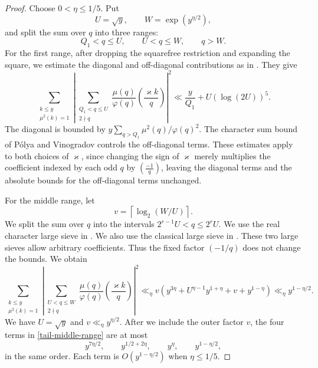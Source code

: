 \documentclass[12pt,reqno]{amsart}
\numberwithin{equation}{section}
\theoremstyle{plain}
\theoremstyle{remark}
\begin{document}
\begin{proof}
Choose $0<\eta\leq1/5$.  Put
\[
 U=\sqrt y,\qquad W=\exp(y^{\eta/2}),
\]
and split the sum over $q$ into three ranges:
\[
 Q_1<q\leq U,\qquad U<q\leq W,\qquad q>W.
\]
For the first range, after dropping the squarefree restriction and expanding the square, we estimate the diagonal and off-diagonal contributions as in \cite[(5.2)]{BaierZhao2007}.  They give
\begin{equation*}\label{tail-short-range}
 \sum_{\substack{k\leq y\\\mu^2(k)=1}}
 \left|\sum_{\substack{Q_1<q\leq U\\2\nmid q}}
 \frac{\mu(q)}{\varphi(q)}
 \left(\frac{\varkappa k}{q}\right)\right|^2
 \ll \frac y{Q_1}+U(\log(2U))^5.
\end{equation*}
The diagonal is bounded by
$y\sum_{q>Q_1}\mu^2(q)/\varphi(q)^2$.  The character sum bound of
P\'olya and Vinogradov controls the off-diagonal terms.  These estimates apply to both choices of $\varkappa$, since changing
the sign of $\varkappa$ merely multiplies the coefficient indexed
by each odd $q$ by $(\frac{-1}{q})$, leaving the diagonal terms
and the absolute bounds for the off-diagonal terms unchanged.

For the middle range, let
\begin{equation*}
 v=\left\lceil\log_2(W/U)\right\rceil.
\end{equation*}
We split the sum over $q$ into the intervals
$2^{r-1}U<q\leq2^rU$.  We use the real character large sieve in
\cite{HeathBrown1995}.  We also use the classical large sieve
in \cite[(5.3) to (5.6)]{BaierZhao2007}.  These two large sieves allow
arbitrary coefficients.  Thus the fixed factor $(-1/q)$ does not change the bounds.
We obtain
\begin{equation}\label{tail-middle-range}
 \sum_{\substack{k\leq y\\\mu^2(k)=1}}
 \left|\sum_{\substack{U<q\leq W\\2\nmid q}}
 \frac{\mu(q)}{\varphi(q)}
 \left(\frac{\varkappa k}{q}\right)\right|^2
\ll_\eta
 v\left(y^{3\eta}+U^{\eta-1}y^{1+\eta}
       +v+y^{1-\eta}\right)
 \ll_\eta y^{1-\eta/2}.
\end{equation}
We have $U=\sqrt y$ and $v\ll_\eta y^{\eta/2}$.  After we include the
outer factor $v$, the four terms in \eqref{tail-middle-range} are at
most
\[
 y^{7\eta/2},\qquad y^{1/2+2\eta},\qquad
 y^\eta,\qquad y^{1-\eta/2},
\]
in the same order.  Each term is $O(y^{1-\eta/2})$ when
$\eta\leq1/5$.


\end{proof}
\end{document}
